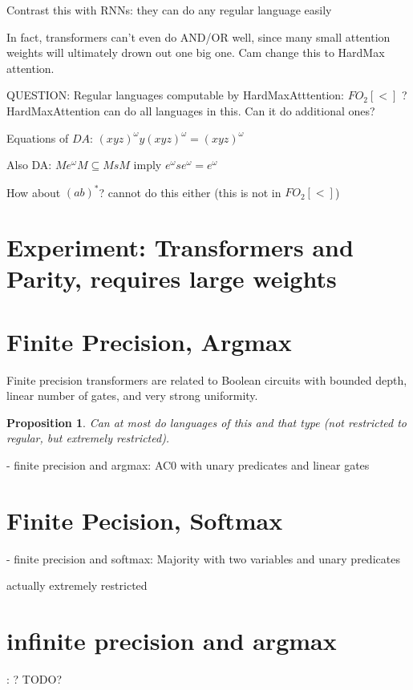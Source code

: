 \documentclass[11pt,a4paper]{article}
\newcounter{theorem}
\newtheorem{proposition}[theorem]{Proposition}
\begin{document}
Contrast this with RNNs: they can do any regular language easily

In fact, transformers can't even do AND/OR well, since many small attention weights will ultimately drown out one big one. Cam change this to HardMax attention.

QUESTION: Regular languages computable by HardMaxAtttention: $FO_2[<]$ ? HardMaxAttention can do all languages in this. Can it do additional ones?

Equations of $DA$: $(xyz)^\omega y (xyz)^\omega = (xyz)^\omega$

Also DA: $Me^\omega M \subseteq MsM$ imply $e^\omega s e^\omega = e^\omega$



How about $(ab)^*$? cannot do this either (this is not in $FO_2[<]$)

\section{Experiment: Transformers and Parity, requires large weights}

\section{Finite Precision, Argmax}

Finite precision transformers are related to Boolean circuits with bounded depth, linear number of gates, and very strong uniformity.

\begin{proposition}
Can at most do languages of this and that type (not restricted to regular, but extremely restricted).
\end{proposition}

- finite precision and argmax: AC0 with unary predicates and linear gates

\section{Finite Pecision, Softmax}

- finite precision and softmax: Majority with two variables and unary predicates

actually extremely restricted

\section{infinite precision and argmax}: ? TODO?
\end{document}
